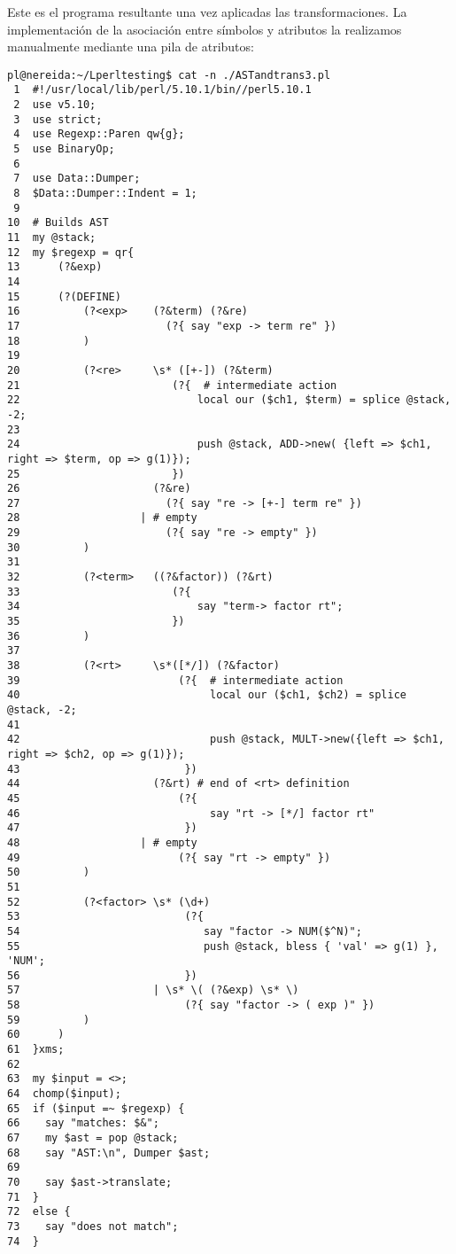 Este es el programa resultante una vez aplicadas las transformaciones.
La implementación de la asociación entre símbolos y atributos la realizamos
manualmente mediante una pila de atributos:
\begin{verbatim}
pl@nereida:~/Lperltesting$ cat -n ./ASTandtrans3.pl
 1  #!/usr/local/lib/perl/5.10.1/bin//perl5.10.1
 2  use v5.10;
 3  use strict;
 4  use Regexp::Paren qw{g};
 5  use BinaryOp;
 6
 7  use Data::Dumper;
 8  $Data::Dumper::Indent = 1;
 9
10  # Builds AST
11  my @stack;
12  my $regexp = qr{
13      (?&exp)
14
15      (?(DEFINE)
16          (?<exp>    (?&term) (?&re)
17                       (?{ say "exp -> term re" })
18          )
19
20          (?<re>     \s* ([+-]) (?&term)
21                        (?{  # intermediate action
22                            local our ($ch1, $term) = splice @stack, -2;
23
24                            push @stack, ADD->new( {left => $ch1, right => $term, op => g(1)});
25                        })
26                     (?&re)
27                       (?{ say "re -> [+-] term re" })
28                   | # empty
29                       (?{ say "re -> empty" })
30          )
31
32          (?<term>   ((?&factor)) (?&rt)
33                        (?{
34                            say "term-> factor rt";
35                        })
36          )
37
38          (?<rt>     \s*([*/]) (?&factor)
39                         (?{  # intermediate action
40                              local our ($ch1, $ch2) = splice @stack, -2;
41
42                              push @stack, MULT->new({left => $ch1, right => $ch2, op => g(1)});
43                          })
44                     (?&rt) # end of <rt> definition
45                         (?{
46                              say "rt -> [*/] factor rt"
47                          })
48                   | # empty
49                         (?{ say "rt -> empty" })
50          )
51
52          (?<factor> \s* (\d+)
53                          (?{
54                             say "factor -> NUM($^N)";
55                             push @stack, bless { 'val' => g(1) }, 'NUM';
56                          })
57                     | \s* \( (?&exp) \s* \)
58                          (?{ say "factor -> ( exp )" })
59          )
60      )
61  }xms;
62
63  my $input = <>;
64  chomp($input);
65  if ($input =~ $regexp) {
66    say "matches: $&";
67    my $ast = pop @stack;
68    say "AST:\n", Dumper $ast;
69
70    say $ast->translate;
71  }
72  else {
73    say "does not match";
74  }
\end{verbatim}

